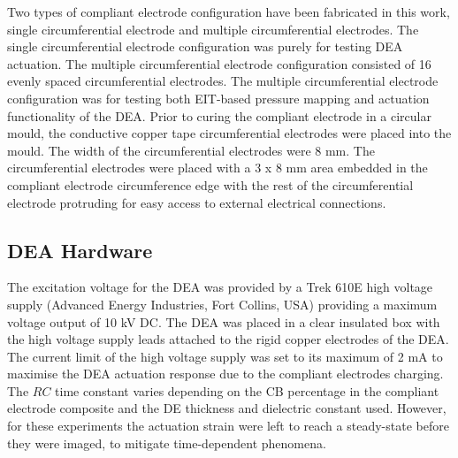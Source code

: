 Two types of compliant electrode configuration have been fabricated in this work, single circumferential electrode and multiple circumferential electrodes. The single circumferential electrode configuration was purely for testing DEA actuation. The multiple circumferential electrode configuration consisted of 16 evenly spaced circumferential electrodes. The multiple circumferential electrode configuration was for testing both EIT-based pressure mapping and actuation functionality of the DEA. Prior to curing the compliant electrode in a circular mould, the conductive copper tape circumferential electrodes were placed into the mould. The width of the circumferential electrodes were 8 mm. The circumferential electrodes were placed with a 3 x 8 mm area embedded in the compliant electrode circumference edge with the rest of the circumferential electrode protruding for easy access to external electrical connections.


\subsection{DEA Hardware}
\label{subsec:dea_hw}
The excitation voltage for the DEA was provided by a Trek 610E high voltage supply (Advanced Energy Industries, Fort Collins, USA) providing a maximum voltage output of 10 kV DC. The DEA was placed in a clear insulated box with the high voltage supply leads attached to the rigid copper electrodes of the DEA. The current limit of the high voltage supply was set to its maximum of 2 mA to maximise the DEA actuation response due to the compliant electrodes charging. The $RC$ time constant varies depending on the CB percentage in the compliant electrode composite and the DE thickness and dielectric constant used. However, for these experiments the actuation strain were left to reach a steady-state before they were imaged, to mitigate time-dependent phenomena.

